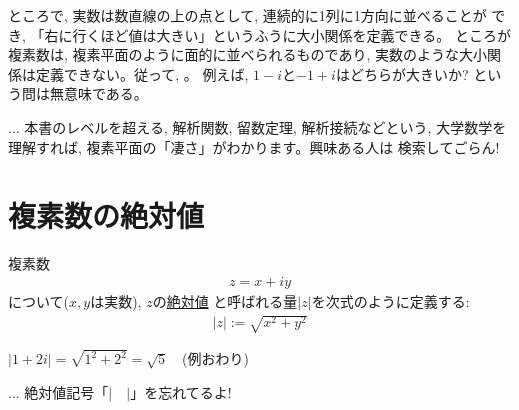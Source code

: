 
ところで, 実数は数直線の上の点として, 連続的に1列に1方向に並べることが
でき, 「右に行くほど値は大きい」というふうに大小関係を定義できる。
ところが複素数は, 複素平面のように面的に並べられるものであり, 
実数のような大小関係は定義できない。従って, 。
例えば, $1-i$と$-1+i$はどちらが大きいか? という問は無意味である。

\begin{faq}\label{faq:complex_plane}{\small{}
... 本書のレベルを超える, 解析関数, 留数定理, 解析接続などという, 
大学数学を理解すれば, 複素平面の「凄さ」がわかります。興味ある人は
検索してごらん!}\end{faq}
\hv



\section{複素数の絶対値}
複素数
\begin{eqnarray}z=x+iy\label{eq:complex_x_iy}\end{eqnarray}
について($x, y$は実数), $z$の\underline{絶対値} 
と呼ばれる量$|z|$を次式のように定義する:
\begin{eqnarray}|z|:=\sqrt{x^2+y^2}\label{eq:def_abs_complex}\end{eqnarray}

\begin{exmpl} $|1+2i|=\sqrt{1^2+2^2}=\sqrt{5}$　(例おわり)\end{exmpl}
\mv

\begin{freqmiss}{\small{} ...
絶対値記号「$|$　$|$」を忘れてるよ!}\end{freqmiss}
\mv

